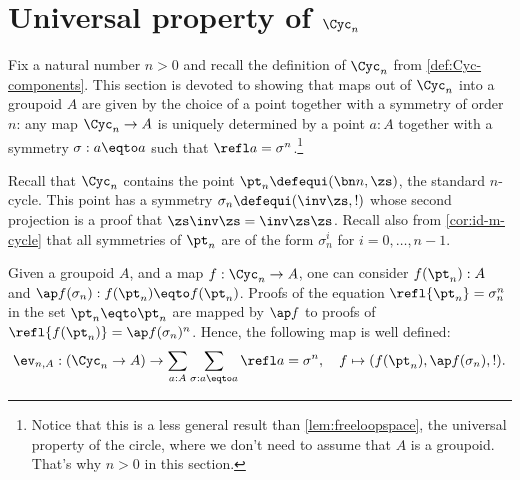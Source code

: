 \section{Universal property of $\Cyc_n$}
\label{sec:universal-property-cyc-n}

Fix a natural number $n>0$ and recall the definition of $\Cyc_n$
from \cref{def:Cyc-components}.
This section is devoted to showing that maps out of $\Cyc_n$ into a groupoid $A$
are given by the choice of a point together with a symmetry of
order $n$: any map $\Cyc_n \to A$ is uniquely determined by a point $a:A$ together with a symmetry $\sigma:a\eqto a$ such that
$\refl a =\sigma^n$.\footnote{Notice that this is a less general result than \cref{lem:freeloopspace}, the universal property of the circle, where we don't need to assume that $A$ is a groupoid. That's why $n>0$ in this section.}

Recall that $\Cyc_n$ contains the point $\pt_n \defequi (\bn n, \zs)$,
\ie the standard $n$-cycle. This
point has a symmetry $\sigma_n \defequi (\inv\zs, !)$ whose second
projection is a proof that $\zs\inv\zs = \inv\zs\zs$.
%
Recall also from \cref{cor:id-m-cycle} that all symmetries of
$\pt_n$ are of the form $\sigma_n^i$ for $i=0,\dots,n-1$.

Given a groupoid $A$, and a map $f :
\Cyc_n \to A$, one can consider $f(\pt_n):A$ and
$\ap f (\sigma_n): f(\pt_n) \eqto f(\pt_n)$.
Proofs of the equation $\refl{\pt_n} = \sigma_n^n$ in the
set $\pt_n \eqto \pt_n$ are mapped by $\ap f$ to proofs of
$\refl{f(\pt_n)} = \ap f(\sigma_n)^n$.
Hence, the following map is well defined:
\begin{displaymath}
  \ev_{n,A} : (\Cyc_n \to A) \to
          \sum_{a:A}\sum_{\sigma:a\eqto a}\refl a = \sigma^n,\quad
  f \mapsto (f(\pt_n), \ap f (\sigma_n), !).
\end{displaymath}


